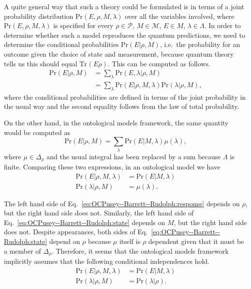 \documentclass[DIV=calc,paper=a4,fontsize=11pt,twocolumn]{scrartcl} %
\theoremstyle{definition}
\theoremstyle{plain}
\newcommand{\Tr}[2][]{\ensuremath{\text{Tr}_{#1} \left ( #2 \right )}}
\begin{document}
A quite general way that such a theory could be formulated is in terms
of a joint probability distribution $\text{Pr}(E,\rho,M,\lambda)$ over
all the variables involved, where $\text{Pr}(E,\rho,M,\lambda)$ is
specified for every $\rho \in \mathcal{P}$, $M \in \mathcal{M}$, $E
\in M$, $\lambda \in \Lambda$.  In order to determine whether such a
model reproduces the quantum predictions, we need to determine the
conditional probabilities $\text{Pr}(E|\rho,M)$, i.e.\ the probability
for an outcome given the choice of state and measurement, because
quantum theory tells us this should equal $\Tr{E\rho}$.  This can be
computed as follows.
\begin{align}
\text{Pr}(E|\rho, M) &= \sum_{\lambda} \text{Pr}(E,\lambda| \rho,
M)\nonumber\\
&= \sum_{\lambda} \text{Pr}(E|\rho,M,\lambda)
\text{Pr}(\lambda|\rho,M),
\end{align}
where the conditional probabilities are defined in terms of the joint
probability in the usual way and the second equality follows from the
law of total probability.

On the other hand, in the ontological models framework, the same
quantity would be computed as
\begin{equation}
\text{Pr}(E|\rho,M) = \sum_{\lambda} \text{Pr}(E|M,\lambda)
\mu(\lambda),
\end{equation}
where $\mu \in \Delta_\rho$ and the usual integral has been replaced
by a sum because $\Lambda$ is finite.  Comparing these two
expressions, in an ontological model we have
\begin{align}
\text{Pr}(E|\rho,M,\lambda) & =
\text{Pr}(E|M,\lambda) \label{eq:OCPusey--Barrett--Rudolph:response} \\
\text{Pr}(\lambda|\rho,M) & = \mu(\lambda). \label{eq:OCPusey--Barrett--Rudolph:state}
\end{align}

The left hand side of Eq.~\eqref{eq:OCPusey--Barrett--Rudolph:response} depends on $\rho$,
but the right hand side does not.  Similarly, the left hand side of
Eq.~\eqref{eq:OCPusey--Barrett--Rudolph:state} depends on $M$, but the right hand side
does not.  Despite appearances, both sides of
Eq.~\eqref{eq:OCPusey--Barrett--Rudolph:state} depend on $\rho$ because $\mu$ itself is
$\rho$ dependent given that it must be a member of $\Delta_{\rho}$.
Therefore, it seems that the ontological models framework implicitly
assumes that the following conditional independences hold.
\begin{align}
\text{Pr}(E|\rho,M,\lambda) & = \text{Pr}(E|M,\lambda) \\
\text{Pr}(\lambda|\rho,M) & = \text{Pr}(\lambda|\rho).
\end{align}
\end{document}
